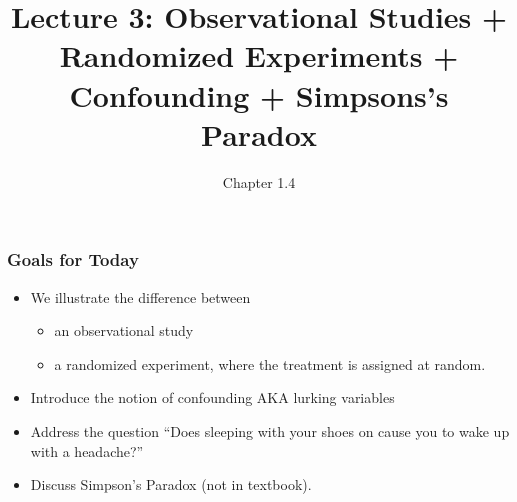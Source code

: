 \documentclass[handout]{beamer}
\title{Lecture 3: Observational Studies + Randomized Experiments + Confounding + Simpsons's Paradox}
\author{Chapter 1.4}
\date{}
\newcommand{\blue}[1]{\textcolor{blue2}{#1}}
\begin{document}
\begin{frame}
\titlepage
\end{frame}


\begin{frame}
\frametitle{Goals for Today}

\begin{itemize}
\item We illustrate the difference between
\begin{itemize}
  \item an \blue{observational study}
  \item a \blue{randomized experiment}, where the treatment is assigned at random.
\end{itemize}
\pause\item Introduce the notion of confounding AKA lurking variables
\pause\item Address the question ``Does sleeping with your shoes on cause you to wake up with a headache?''
\pause\item Discuss \blue{Simpson's Paradox} (not in textbook).
\end{itemize}

\end{frame}
\end{document}
